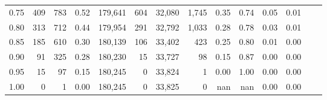 \begin{tabular}{rrrrrrrrrrrrrr}
0.75 &     409 &    783 &    0.52 &  179,641 &      604 &  32,080 &   1,745 &  0.35 &  0.74 &  0.05 &      0.01 \\
0.80 &     313 &    712 &    0.44 &  179,954 &      291 &  32,792 &   1,033 &  0.28 &  0.78 &  0.03 &      0.01 \\
0.85 &     185 &    610 &    0.30 &  180,139 &      106 &  33,402 &     423 &  0.25 &  0.80 &  0.01 &      0.00 \\
0.90 &      91 &    325 &    0.28 &  180,230 &       15 &  33,727 &      98 &  0.15 &  0.87 &  0.00 &      0.00 \\
0.95 &      15 &     97 &    0.15 &  180,245 &        0 &  33,824 &       1 &  0.00 &  1.00 &  0.00 &      0.00 \\
1.00 &       0 &      1 &    0.00 &  180,245 &        0 &  33,825 &       0 &   nan &   nan &  0.00 &      0.00 \\
\bottomrule
\end{tabular}
